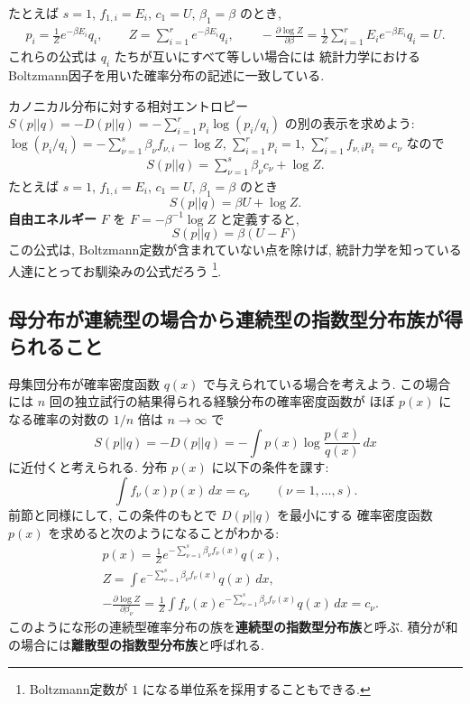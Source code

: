 \documentclass[12pt,twoside]{jarticle}
\renewcommand\d{\partial}
\theoremstyle{definition} %
\theoremstyle{definition} %
\theoremstyle{definition} %
\numberwithin{theorem}{section}
\numberwithin{equation}{section}
\numberwithin{figure}{section}
\numberwithin{table}{section}
\begin{document}
たとえば $s=1$, $f_{1,i}=E_i$, $c_1=U$, $\beta_1=\beta$ のとき, 
\begin{align*}
p_i = \frac{1}{Z}e^{-\beta E_i}q_i,
\qquad
Z = \sum_{i=1}^r e^{-\beta E_i}q_i,
\qquad
-\frac{\d\log Z}{\d\beta} 
= \frac{1}{Z} \sum_{i=1}^r E_i e^{-\beta E_i}q_i = U.
\end{align*}
これらの公式は $q_i$ たちが互いにすべて等しい場合には
統計力学におけるBoltzmann因子を用いた確率分布の記述に一致している.

カノニカル分布に対する相対エントロピー $S(p||q)=-D(p||q)=-\sum_{i=1}^r p_i\log(p_i/q_i)$
の別の表示を求めよう: 
$\log(p_i/q_i)=-\sum_{\nu=1}^s\beta_\nu f_{\nu,i}-\log Z$, $\sum_{i=1}^r p_i=1$,
$\sum_{i=1}^r f_{\nu,i}p_i=c_\nu$ なので
\begin{align*}
S(p||q) = \sum_{\nu=1}^s \beta_\nu c_\nu + \log Z.
\end{align*}
たとえば $s=1$, $f_{1,i}=E_i$, $c_1=U$, $\beta_1=\beta$ のとき
\[
S(p||q) = \beta U + \log Z.
\]
{\bf 自由エネルギー} $F$ を $F=-\beta^{-1}\log Z$ と定義すると,
\[
S(p||q) = \beta(U-F)
\]
この公式は, Boltzmann定数が含まれていない点を除けば,
統計力学を知っている人達にとってお馴染みの公式だろう%
\footnote{Boltzmann定数が $1$ になる単位系を採用することもできる.}.



\subsection{母分布が連続型の場合から連続型の指数型分布族が得られること}

母集団分布が確率密度函数 $q(x)$ で与えられている場合を考えよう.
この場合には $n$ 回の独立試行の結果得られる経験分布の確率密度函数が
ほぼ $p(x)$ になる確率の対数の $1/n$ 倍は $n\to\infty$ で
\[
S(p||q)=-D(p||q) = -\int p(x)\log\frac{p(x)}{q(x)}\,dx
\]
に近付くと考えられる. 分布 $p(x)$ に以下の条件を課す:
\[
\int f_\nu(x)p(x)\,dx = c_\nu
\qquad (\nu=1,\ldots,s).
\]
前節と同様にして, この条件のもとで $D(p||q)$ を最小にする
確率密度函数 $p(x)$ を求めると次のようになることがわかる:
\begin{align*}
&
p(x)=\frac{1}{Z}e^{-\sum_{\nu=1}^s \beta_\nu f_\nu(x)}q(x), 
\\ &
Z=\int e^{-\sum_{\nu=1}^s \beta_\nu f_\nu(x)}q(x)\,dx,
\\ &
-\frac{\d\log Z}{\d\beta_\nu} 
= \frac{1}{Z}\int f_\nu(x) e^{-\sum_{\nu=1}^s \beta_\nu f_\nu(x)}q(x) \,dx
= c_\nu.
\end{align*}
このようにな形の連続型確率分布の族を{\bf 連続型の指数型分布族}と呼ぶ.
積分が和の場合には{\bf 離散型の指数型分布族}と呼ばれる.
\end{document}

